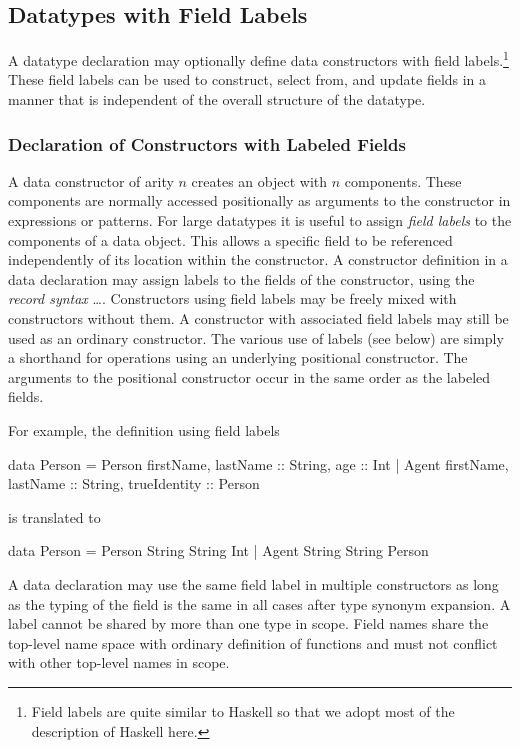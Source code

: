 \subsection {Datatypes with Field Labels}\label{flab}

A datatype declaration may optionally define data constructors
with field labels.\footnote{Field labels are quite similar
to Haskell \cite{PeytonJones03Haskell} so that we adopt most of
the description of Haskell here.}
These field labels can be used to
construct, select from, and update fields in a manner that is
independent of the overall structure of the datatype.

\subsubsection{Declaration of Constructors with Labeled Fields}

A data constructor of arity $n$ creates an object with $n$ components.
These components are normally accessed positionally as arguments to
the constructor in expressions or patterns.  For large datatypes it is
useful to assign \emph{field labels}
to the components of a data
object. This allows a specific field to be referenced independently of
its location within the constructor.  A constructor definition in a
data declaration may assign labels to the fields of the constructor,
using the \emph{record syntax}\pindex{\{\ldots{}\}}
\ldots\code{\}}.
Constructors using field labels
may be freely mixed with constructors without them. A constructor with
associated field labels may still be used as an ordinary constructor.
The various use of labels (see below)
are simply a shorthand for operations using an
underlying positional constructor. The arguments to the positional
constructor occur in the same order as the labeled fields.

\newcommand{\trans}[1]{$[\![$#1$]\!]$}

\translation{\\
\trans{$C$ \{ $lts$ \}} $=$ $C$ \trans{$lts$}\\
\trans{$lt$, $lts$} $=$ \trans{$lt$} \trans{$lts$}\\
\trans{$l$, $ls$\,::\,$t$} $=$ $t$ \trans{$ls$\,::\,$t$}\\
\trans{$l$\,::\,$t$} $=$ $t$
}

\noindent
For example, the definition using field labels
\begin{curry}
data Person = Person {firstName, lastName :: String, age :: Int}
            | Agent { firstName, lastName :: String, trueIdentity :: Person }
\end{curry}
is translated to
\begin{curry}
data Person = Person String String Int
            | Agent String String Person
\end{curry}
%
A data declaration may use the same field label in multiple
constructors as long as the typing of the field is the same in all
cases after type synonym expansion. A label cannot be shared by more
than one type in scope. Field names share the top-level name space with
ordinary definition of functions %
and must not conflict with other top-level names in scope.

